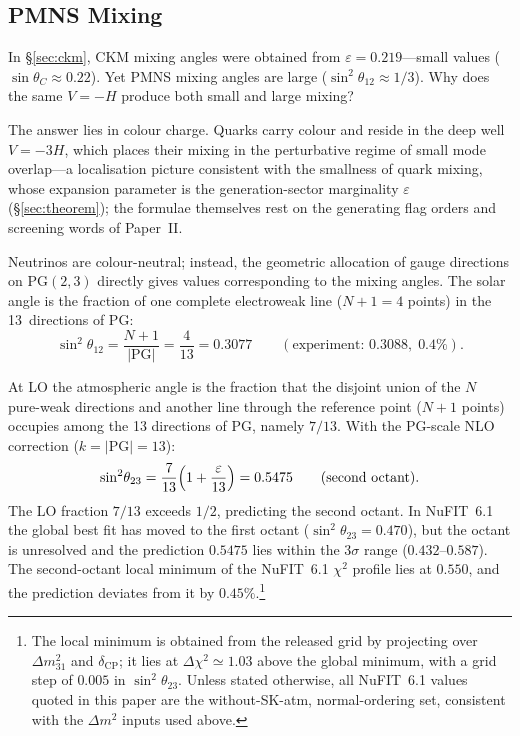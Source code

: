 \documentclass[12pt,a4paper]{article}
\begin{document}
\subsection{PMNS Mixing}

In \S\ref{sec:ckm}, CKM mixing angles were obtained from
$\varepsilon = 0.219$---small values ($\sin\theta_C \approx 0.22$).
Yet PMNS mixing angles are large
($\sin^2\!\theta_{12} \approx 1/3$).
Why does the same $V = -H$ produce both small and large mixing?

The answer lies in colour charge. Quarks carry colour and reside in the deep well $V = -3H$, which places their mixing in the perturbative regime of small mode overlap---a localisation picture consistent with the smallness of quark mixing, whose expansion parameter is the generation-sector marginality $\varepsilon$ (\S\ref{sec:theorem}); the formulae themselves rest on the generating flag orders and screening words of Paper~II.

Neutrinos are colour-neutral; instead, the geometric allocation
of gauge directions on $\mathrm{PG}(2,3)$ directly gives values
corresponding to the mixing angles.
The solar angle is the fraction of one complete electroweak line
($N{+}1 = 4$ points) in the 13~directions of $\mathrm{PG}$:
\begin{equation}
  \sin^2\!\theta_{12} = \frac{N{+}1}{|\mathrm{PG}|}
  = \frac{4}{13} = 0.3077
  \qquad (\text{experiment: } 0.3088,\; 0.4\%).
\end{equation}

At LO the atmospheric angle is the fraction that the disjoint union of the $N$ pure-weak directions and another line through the reference point ($N{+}1$ points) occupies among the 13 directions of PG, namely $7/13$. With the PG-scale NLO correction ($k = |\mathrm{PG}| = 13$):
\begin{equation}
  \sin^2\!\theta_{23} = \frac{7}{13}\Bigl(1 + \frac{\varepsilon}{13}\Bigr) = 0.5475
  \qquad (\text{second octant}).
\end{equation}
The LO fraction $7/13$ exceeds $1/2$,
predicting the second octant. In NuFIT~6.1~\cite{nufit} the global best fit has moved to the first octant ($\sin^2\theta_{23} = 0.470$), but the octant is unresolved and the prediction $0.5475$ lies within the $3\sigma$ range ($0.432$--$0.587$). The second-octant local minimum of the NuFIT~6.1 $\chi^2$ profile lies at $0.550$, and the prediction deviates from it by $0.45\%$.\footnote{The local minimum is obtained from the released grid by projecting over $\Delta m^2_{31}$ and $\delta_\mathrm{CP}$; it lies at $\Delta\chi^2\simeq1.03$ above the global minimum, with a grid step of $0.005$ in $\sin^2\!\theta_{23}$. Unless stated otherwise, all NuFIT~6.1 values quoted in this paper are the without-SK-atm, normal-ordering set, consistent with the $\Delta m^2$ inputs used above.}
\end{document}
